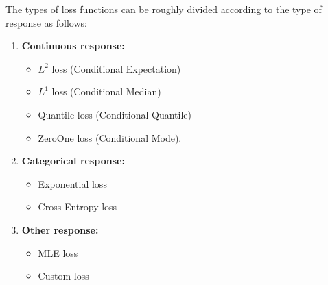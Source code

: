 The types of loss functions can be roughly divided according to the type of response
as follows:
\begin{enumerate}
	\item \textbf{Continuous response:}
	\begin{itemize}
		\vspace{-.2cm}
		\item $L^2$ loss (Conditional Expectation)
		\vspace{-.2cm}
		\item $L^1$ loss (Conditional Median)
		\vspace{-.2cm}
		\item Quantile loss (Conditional Quantile)
		\vspace{-.2cm}
		\item ZeroOne loss (Conditional Mode).
		\vspace{-.2cm}
	\end{itemize}
	\item \textbf{Categorical response:}
	\begin{itemize}
		\vspace{-.2cm}
		\item Exponential loss
		\vspace{-.2cm}
		\item Cross-Entropy loss
		\vspace{-.2cm}
	\end{itemize}
	\item \textbf{Other response:}
	\begin{itemize}
		\vspace{-.2cm}
		\item MLE loss 
		\vspace{-.2cm}
		\item Custom loss
		\vspace{-.2cm}
	\end{itemize}
\end{enumerate}

